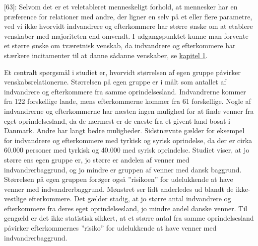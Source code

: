 \documentclass[
]{book}
\begin{document}
{[}63{]}: Selvom det er et veletableret menneskeligt forhold, at mennesker har en præference for relationer med andre, der ligner en selv på et eller flere parametre, ved vi ikke hvorvidt indvandrere og efterkommere har større ønske om at etablere venskaber med majoriteten end omvendt. I udgangspunktet kunne man forvente et større ønske om tværetnisk venskab, da indvandrere og efterkommere har stærkere incitamenter til at danne sådanne venskaber, se \hyperref[kap1]{kapitel 1}.

Et centralt spørgsmål i studiet er, hvorvidt størrelsen af egen gruppe påvirker venskabsrelationerne. Størrelsen på egen gruppe er i målt som antallet af indvandrere og efterkommere fra samme oprindelsesland. Indvandrerne kommer fra 122 forskellige lande, mens efterkommerne kommer fra 61 forskellige. Nogle af indvandrerne og efterkommerne har næsten ingen mulighed for at finde venner fra eget oprindelsesland, da de nærmest er de eneste fra et givent land bosat i Danmark. Andre har langt bedre muligheder. Sidstnævnte gælder for eksempel for indvandrere og efterkommere med tyrkisk og syrisk oprindelse, da der er cirka 60.000 personer med tyrkisk og 40.000 med syrisk oprindelse. Studiet viser, at jo større ens egen gruppe er, jo større er andelen af venner med indvandrerbaggrund, og jo mindre er gruppen af venner med dansk baggrund. Størrelsen på egen gruppen forøger også ''risikoen'' for udelukkende at have venner med indvandrerbaggrund. Mønstret ser lidt anderledes ud blandt de ikke-vestlige efterkommere. Det gælder stadig, at jo større antal indvandrere og efterkommere fra deres eget oprindelsesland, jo mindre andel danske venner. Til gengæld er det ikke statistisk sikkert, at et større antal fra samme oprindelsesland påvirker efterkommernes ''risiko'' for udelukkende at have venner med indvandrerbaggrund.
\end{document}

